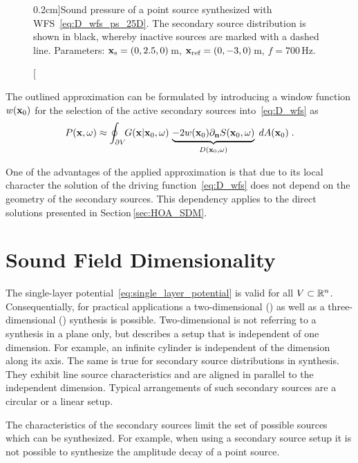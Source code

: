 \begin{figure}
    \small
    \centering
    
    \caption[][0.2cm]{Sound pressure of a point source synthesized with
    \ac{WFS}~\protect\eqref{eq:D_wfs_ps_25D}. The secondary source
        distribution is shown in black, whereby inactive sources are marked with a
        dashed line. Parameters: $\mathbf{x}_\text{s} = (0,2.5,0)$\,m,
        $\mathbf{x}_\text{ref} = (0,-3,0)$\,m, $f = 700$\,Hz.
        }
    \label{fig:concave_array}
\end{figure}

The outlined approximation can be formulated by
introducing a window function $w(\mathbf{x}_0)$ for the selection of the active
secondary sources into~\eqref{eq:D_wfs} as
%
\begin{equation}
    P(\x,\omega) \approx \oint_{\partial V} \!\!  G(\x|\x_0,\omega) \,
    \underbrace{-2 w(\x_0) \partial_\n S(\x_0,\omega)}_{D(\x_0,\omega)} \; d
    A(\x_0) \qp
    \label{eq:P_wfs}
\end{equation}
%

One of the advantages of the applied approximation is that due to its local
character the solution of the driving function~\eqref{eq:D_wfs} does not depend on
the geometry of the secondary sources. This dependency applies to the direct
solutions presented in Section\,\ref{sec:HOA_SDM}.


\section{Sound Field Dimensionality}
\label{sec:sound_field_dimensionality}
%
The single-layer potential~\eqref{eq:single_layer_potential} is valid for all $V
\subset \mathbb{R}^n$. Consequentially, for practical applications a two-dimensional
(\twoD) as well as a three-dimensional (\threeD) synthesis is possible.
Two-dimensional is not referring to a synthesis in a plane only, but describes a setup
that is independent of one dimension. For example, an infinite cylinder is
independent of the dimension along its axis. The same is true
for secondary source distributions in \twoD synthesis. They exhibit
line source characteristics and are aligned in parallel to
the independent dimension. Typical arrangements of such secondary sources are
a circular or a linear setup.

The characteristics of the secondary
sources limit the set of possible sources which can be synthesized. For example,
when using a \twoD secondary source setup it is not possible to synthesize the
amplitude decay of a point source.


